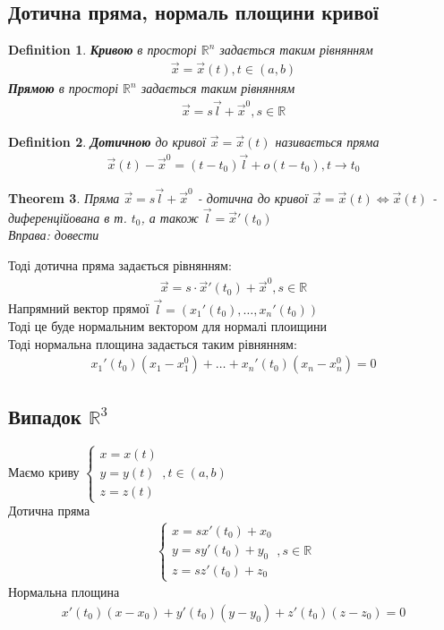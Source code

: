 \documentclass[a4paper, 14pt]{extarticle}
\theoremstyle{theoremdd}
\newtheorem{theorem}{Theorem}[subsection]
\theoremstyle{theoremdd}
\newtheorem{definition}[theorem]{Definition}
\theoremstyle{theoremdd}
\theoremstyle{theoremdd}
\theoremstyle{theoremdd}
\theoremstyle{theoremdd}
\theoremstyle{theoremdd}
\theoremstyle{theoremdd}
\begin{document}
\subsection{Дотична пряма, нормаль площини кривої}
\begin{definition}
\textbf{Кривою} в просторі $\mathbb{R}^n$ задається таким рівнянням
\begin{align*}
\vec{x} = \vec{x}(t), t \in (a,b)
\end{align*}
\textbf{Прямою} в просторі $\mathbb{R}^n$ задається таким рівнянням
\begin{align*}
\vec{x} = s \vec{l} + \vec{x}^0, s \in \mathbb{R}
\end{align*}
\end{definition}

\begin{definition}
\textbf{Дотичною} до кривої $\vec{x} = \vec{x}(t)$ називається пряма
\begin{align*}
\vec{x}(t) - \vec{x}^0 = (t-t_0) \vec{l} + o(t-t_0), t \to t_0
\end{align*}
\end{definition}

\begin{theorem}
Пряма $\vec{x} = s \vec{l} + \vec{x}^0$ - дотична до кривої $\vec{x} = \vec{x}(t) \iff \vec{x}(t)$ - диференційована в т. $t_0$, а також $\vec{l} = \vec{x}'(t_0)$\\
\textit{Вправа: довести}
\end{theorem}
Тоді дотична пряма задається рівнянням:
\begin{align*}
\vec{x} = s \cdot \vec{x}'(t_0) + \vec{x}^0, s \in \mathbb{R}
\end{align*}
Напрямний вектор прямої $\vec{l} = (x_1'(t_0),\dots, x_n'(t_0))$\\
Тоді це буде нормальним вектором для нормалі плоищини\\
Тоді нормальна площина задається таким рівнянням:
\begin{align*}
x_1'(t_0)(x_1-x_1^0) + \dots + x_n'(t_0)(x_n-x_n^0)=0
\end{align*}

\subsection*{Випадок $\mathbb{R}^3$}
Маємо криву $\begin{cases} x=x(t) \\ y=y(t) \\ z=z(t) \end{cases}, t \in (a,b)$\\
Дотична пряма
\begin{align*}
\begin{cases}
x=s x'(t_0)+x_0 \\
y=s y'(t_0)+y_0\\
z=s z'(t_0)+z_0
\end{cases}, s \in \mathbb{R}
\end{align*}
Нормальна площина
\begin{align*}
x'(t_0)(x-x_0)+y'(t_0)(y-y_0)+z'(t_0)(z-z_0)=0
\\
\end{align*}
\end{document}
